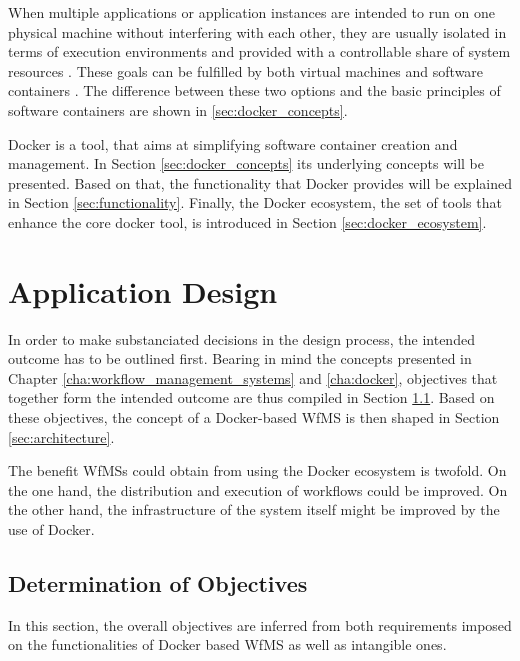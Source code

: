 \documentclass[language=english,noinputenc]{wiwwuwordrprt}
\begin{document}
    When multiple applications or application instances are intended to run on one physical machine without interfering with each other, they are usually isolated in terms of execution environments and provided with a controllable share of system resources \cite{Felter2014Updated}. These goals can be fulfilled by both virtual machines and software containers \cite{Ruiz2015Performance}. The difference between these two options and the basic principles of software containers are shown in \ref{sec:docker_concepts}.

    Docker is a tool, that aims at simplifying software container creation and management. In Section \ref{sec:docker_concepts} its underlying concepts will be presented. Based on that, the functionality that Docker provides will be explained in Section \ref{sec:functionality}. Finally, the Docker ecosystem, \ie the set of tools that enhance the core docker tool, is introduced in Section \ref{sec:docker_ecosystem}.

    

  \chapter{Application Design} %
    \label{cha:solution_design}

    In order to make substanciated decisions in the design process, the intended outcome has to be outlined first. Bearing in mind the concepts presented in Chapter \ref{cha:workflow_management_systems} and \ref{cha:docker}, objectives that together form the intended outcome are thus compiled in Section \ref{sec:determination_of_objectives}. Based on these objectives, the concept of a Docker-based \ac{WfMS} is then shaped in Section \ref{sec:architecture}.

    The benefit \acp{WfMS} could obtain from using the Docker ecosystem is twofold.
    On the one hand, the distribution and execution of workflows could be improved.
    On the other hand, the infrastructure of the system itself might be improved by the use of Docker.

    \section{Determination of Objectives} %
      \label{sec:determination_of_objectives}

      In this section, the overall objectives are inferred from both requirements imposed on the functionalities of Docker based \ac{WfMS} as well as intangible ones.
\end{document}
